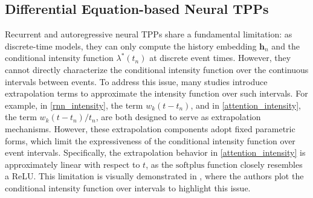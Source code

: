 \documentclass[10pt]{article} %
\begin{document}
\subsection{Differential Equation-based Neural TPPs}
\label{differential}

Recurrent and autoregressive neural TPPs share a fundamental limitation: as discrete-time models, they can only compute the history embedding $\mathbf{h}_n$ and the conditional intensity function $\lambda^*(t_n)$ at discrete event times. However, they cannot directly characterize the conditional intensity function over the continuous intervals between events. To address this issue, many studies introduce extrapolation terms to approximate the intensity function over such intervals. 
For example, in \cref{rnn_intensity}, the term $w_k(t - t_n)$, and in \cref{attention_intensity}, the term $w_k(t - t_n)/t_n$, are both designed to serve as extrapolation mechanisms. However, these extrapolation components adopt fixed parametric forms, which limit the expressiveness of the conditional intensity function over event intervals. Specifically, the extrapolation behavior in \cref{attention_intensity} is approximately linear with respect to $t$, as the $\text{softplus}$ function closely resembles a ReLU. This limitation is visually demonstrated in \citet{meng2024interpretable}, where the authors plot the conditional intensity function over intervals to highlight this issue. 
\end{document}
